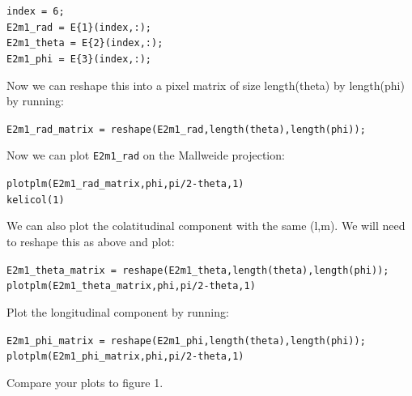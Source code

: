 \documentclass[11pt]{article}
\begin{document}
\verb|index = 6;|\\
\verb|E2m1_rad = E{1}(index,:);|\\
\verb|E2m1_theta = E{2}(index,:);|\\
\verb|E2m1_phi = E{3}(index,:);|

Now we can reshape this into a pixel matrix of size length(theta) by length(phi) by running: 

\verb|E2m1_rad_matrix = reshape(E2m1_rad,length(theta),length(phi));|

Now we can plot \verb|E2m1_rad| on the Mallweide projection:

\verb|plotplm(E2m1_rad_matrix,phi,pi/2-theta,1)|\\
\verb|kelicol(1)|

We can also plot the colatitudinal component with the same (l,m).  We will need to reshape this as above and plot:

\verb|E2m1_theta_matrix = reshape(E2m1_theta,length(theta),length(phi));|\\
\verb|plotplm(E2m1_theta_matrix,phi,pi/2-theta,1)|

Plot the longitudinal component by running:

\verb|E2m1_phi_matrix = reshape(E2m1_phi,length(theta),length(phi));|\\
\verb|plotplm(E2m1_phi_matrix,phi,pi/2-theta,1)|

Compare your plots to figure 1.
\end{document}
